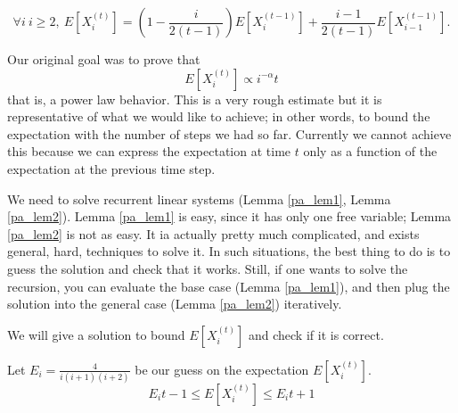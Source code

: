 \begin{lem}\label{pa_lem2}
	\begin{equation}
	\forall i\ i \geq 2,\ E[X_i^{(t)}] = \left(1-\frac{i}{2(t-1)}\right)E[X_i^{(t-1)}] +\frac{i -1}{2(t-1)}E[X_{i-1}^{(t-1)}].
	\end{equation}
\end{lem}

Our original goal was to prove that
\begin{equation}
E[X_i^{(t)}] \propto i^{-\alpha}t
\end{equation}
that is, a power law behavior. This is a very rough estimate but it is representative of what we would like to achieve; in other words, to bound the expectation with the number of steps we had so far. Currently we cannot achieve this because we can express the expectation at time $t$ only as a function of the expectation at the previous time step. 

We need to solve recurrent linear systems (Lemma \ref{pa_lem1}, Lemma \ref{pa_lem2}). Lemma \ref{pa_lem1} is easy, since it has only one free variable; Lemma \ref{pa_lem2} is not as easy. It ia actually pretty much complicated, and exists general, hard, techniques to solve it. In such situations, the best thing to do is to guess the solution and check that it works. Still, if one wants to solve the recursion, you can evaluate the base case (Lemma \ref{pa_lem1}), and then plug the solution into the general case (Lemma \ref{pa_lem2}) iteratively.

We will give a solution to bound $E[X_i^{(t)}]$ and check if it is correct.

\begin{thm}\label{pa_thm}
	Let $E_i = \frac{4}{i(i+1)(i+2)}$ be our guess on the expectation $E[X_i^{(t)}]$. 
	\begin{equation}\label{pa_eq}
		E_it - 1 \leq E[X_i^{(t)}] \leq E_it + 1
	\end{equation}
\end{thm}

